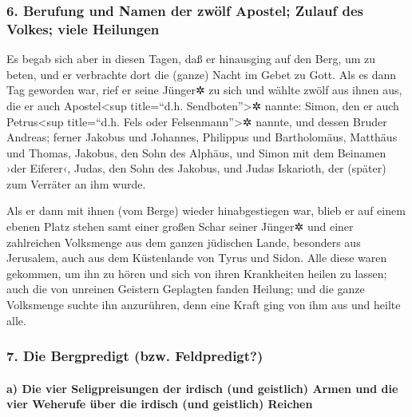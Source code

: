 \hypertarget{berufung-und-namen-der-zwuxf6lf-apostel-zulauf-des-volkes-viele-heilungen}{%
\subsubsection{6. Berufung und Namen der zwölf Apostel; Zulauf des
Volkes; viele
Heilungen}\label{berufung-und-namen-der-zwuxf6lf-apostel-zulauf-des-volkes-viele-heilungen}}

 Es begab sich aber in diesen Tagen, daß er hinausging
auf den Berg, um zu beten, und er verbrachte dort die (ganze) Nacht im
Gebet zu Gott.  Als es dann Tag geworden war, rief er
seine Jünger✲ zu sich und wählte zwölf aus ihnen aus, die er auch
Apostel\textless sup title=``d.h. Sendboten''\textgreater✲ nannte:
 Simon, den er auch Petrus\textless sup title=``d.h. Fels
oder Felsenmann''\textgreater✲ nannte, und dessen Bruder Andreas; ferner
Jakobus und Johannes, Philippus und Bartholomäus, 
Matthäus und Thomas, Jakobus, den Sohn des Alphäus, und Simon mit dem
Beinamen ›der Eiferer‹,  Judas, den Sohn des Jakobus, und
Judas Iskarioth, der (später) zum Verräter an ihm wurde.

 Als er dann mit ihnen (vom Berge) wieder hinabgestiegen
war, blieb er auf einem ebenen Platz stehen samt einer großen Schar
seiner Jünger✲ und einer zahlreichen Volksmenge aus dem ganzen jüdischen
Lande, besonders aus Jerusalem, auch aus dem Küstenlande von Tyrus und
Sidon.  Alle diese waren gekommen, um ihn zu hören und
sich von ihren Krankheiten heilen zu lassen; auch die von unreinen
Geistern Geplagten fanden Heilung;  und die ganze
Volksmenge suchte ihn anzurühren, denn eine Kraft ging von ihm aus und
heilte alle.

\hypertarget{die-bergpredigt-bzw.-feldpredigt}{%
\subsubsection{7. Die Bergpredigt (bzw.
Feldpredigt?)}\label{die-bergpredigt-bzw.-feldpredigt}}

\hypertarget{a-die-vier-seligpreisungen-der-irdisch-und-geistlich-armen-und-die-vier-weherufe-uxfcber-die-irdisch-und-geistlich-reichen}{%
\paragraph{a) Die vier Seligpreisungen der irdisch (und geistlich) Armen
und die vier Weherufe über die irdisch (und geistlich)
Reichen}\label{a-die-vier-seligpreisungen-der-irdisch-und-geistlich-armen-und-die-vier-weherufe-uxfcber-die-irdisch-und-geistlich-reichen}}


